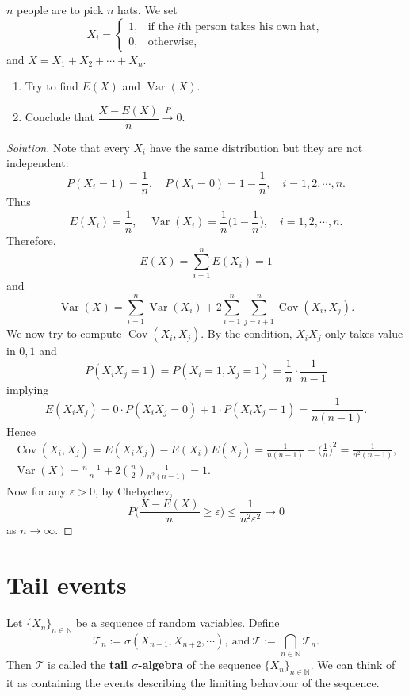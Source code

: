 \documentclass[11pt,singlecolumn, openany, citestyle=authoryear]{elegantbook}
\begin{document}
\begin{CJK}{UTF8}{gbsn}
\begin{exercise}
    $n$ people are to pick $n$ hats. We set 
    $$X_i=
    \begin{cases}
        1,& \text{if the } i\text{th person takes his own hat},\\
        0,& \text{otherwise},
    \end{cases}
    $$
    and $X=X_1+X_2+\cdots+X_n$. 
    \begin{enumerate}
        \item Try to find $E(X)$ and $\operatorname{Var}(X)$.
        \item Conclude that $\dfrac{X-E(X)}{n}\overset{P}{\longrightarrow} 0.$
    \end{enumerate}
    \end{exercise}
\begin{proof}[Solution]
    Note that every $X_i$ have the same distribution but they are not independent:
    $$
    P(X_i=1)=\frac{1}{n},\quad P(X_i=0)=1-\frac{1}{n}, \quad i=1,2,\cdots,n.
    $$ 
    Thus 
    $$
    E(X_i)=\frac{1}{n},\quad \operatorname{Var}(X_i)=\frac{1}{n}\biggl(1-\frac{1}{n}\biggr),
    \quad i=1,2,\cdots,n.
    $$
    Therefore, 
    $$
    E(X)=\sum_{i=1}^n E(X_i)=1
    $$
    and 
    $$
    \operatorname{Var}(X)=\sum_{i=1}^n \operatorname{Var}(X_i)+2\sum_{i=1}^n \sum_{j=i+1}^n 
    \operatorname{Cov}(X_i,X_j).
    $$
    We now try to compute $\operatorname{Cov}(X_i,X_j)$. By the condition, $X_iX_j$ only takes 
    value in $0,1$ and  
    $$
    P(X_iX_j=1)=P(X_i=1,X_j=1)=\frac{1}{n}\cdot \frac{1}{n-1}
    $$
    implying
    $$
    E(X_iX_j)=0\cdot P(X_iX_j=0)+1\cdot P(X_iX_j=1)=\frac{1}{n(n-1)}.
    $$
    Hence
\begin{gather*}
    \operatorname{Cov}(X_i,X_j)=E(X_iX_j)-E(X_i)E(X_j)=\frac{1}{n(n-1)}-\biggl(
        \frac{1}{n}
    \biggr)^2 = \frac{1}{n^2(n-1)},\\
    \operatorname{Var}(X)=\frac{n-1}{n}+2\binom{n}{2}\frac{1}{n^2(n-1)}=1.
\end{gather*}
Now for any $\varepsilon>0$, by Chebychev,
$$
P\biggl(
    \frac{X-E(X)}{n}\geqslant \varepsilon
\biggr)\leqslant 
\frac{1}{n^2\varepsilon^2}\longrightarrow 0
$$
as $n\to\infty$.
\end{proof}

\section{Tail events}
\begin{definition}
    Let $\{X_n\}_{n\in \mathbb{N}}$
    be a sequence of random variables. Define
    $$
    \mathcal{T}_n := \sigma(X_{n+1}, X_{n+2}, \cdots ), \ \text{and}\
    \mathcal{T} := \bigcap_{n \in \mathbb{N}}\mathcal{T}_n.
    $$
    Then $\mathcal{T}$ is called the \textbf{tail $\sigma$-algebra} of the sequence 
    $\{X_n\}_{n\in \mathbb{N}}$. We can think of it as containing the events describing the limiting behaviour of the sequence.
\end{definition}


\end{CJK}
\end{document}
